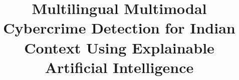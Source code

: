 \documentclass[conference]{IEEEtran}
\begin{document}
\title{Multilingual Multimodal Cybercrime Detection for Indian Context Using Explainable Artificial Intelligence}


\maketitle
\thispagestyle{empty}

\thispagestyle{empty}











\nocite{*}


\end{document}
